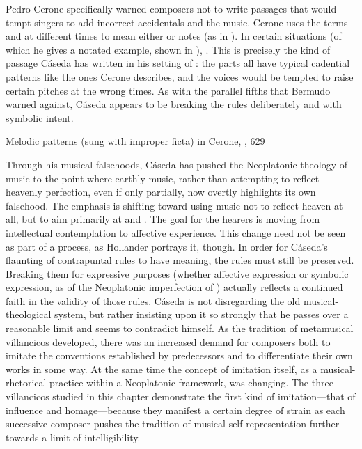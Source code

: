 Pedro Cerone specifically warned composers not to write passages that would
tempt singers to add incorrect accidentals and  the music.
Cerone uses the terms  and  at different
times to mean either  or  notes (as in
).
In certain situations (of which he gives a notated example, shown in
), .%
    \Autocite[629]{Cerone:Melopeo}
This is precisely the kind of passage Cáseda has written in his setting of
: the parts all have typical cadential patterns like
the ones Cerone describes, and the voices would be tempted to raise certain
pitches at the wrong times. 
As with the parallel fifths that Bermudo warned against, Cáseda appears to be
breaking the rules deliberately and with symbolic intent.

{Melodic patterns  (sung with improper
ficta) in Cerone, , 629} 

Through his musical falsehoods, Cáseda has pushed the Neoplatonic theology of
music to the point where earthly music, rather than attempting to reflect
heavenly perfection, even if only partially, now overtly highlights its own
falsehood.
The emphasis is shifting toward using music not to reflect heaven at all, but
to aim primarily at  and .
The goal for the hearers is moving from intellectual contemplation to affective
experience.
This change need not be seen as part of a  process, as
Hollander portrays it, though.
In order for Cáseda's flaunting of contrapuntal rules to have meaning, the
rules must still be preserved.
Breaking them for expressive purposes (whether affective expression or symbolic
expression, as of the Neoplatonic imperfection of ) actually reflects a continued faith in the validity of those
rules.
Cáseda is not disregarding the old musical-theological system, but rather
insisting upon it so strongly that he passes over a reasonable limit and seems
to contradict himself.
As the tradition of metamusical villancicos developed, there was an increased
demand for composers both to imitate the conventions established by
predecessors and to differentiate their own works in some way. 
At the same time the concept of imitation itself, as a musical-rhetorical
practice within a Neoplatonic framework, was changing.
The three villancicos studied in this chapter demonstrate the first kind of
imitation---that of influence and homage---because they manifest a certain
degree of strain as each successive composer pushes the tradition of musical
self-representation further towards a limit of intelligibility.

